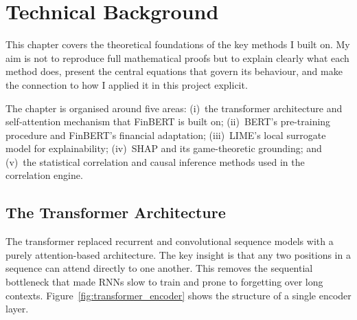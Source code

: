 \chapter{Technical Background}\label{chap:theory}

This chapter covers the theoretical foundations of the key methods I built on.
My aim is not to reproduce full mathematical proofs but to explain clearly what each
method does, present the central equations that govern its behaviour, and make the
connection to how I applied it in this project explicit.

The chapter is organised around five areas:
(i)~the transformer architecture and self-attention mechanism that FinBERT is built on;
(ii)~BERT's pre-training procedure and FinBERT's financial adaptation;
(iii)~LIME's local surrogate model for explainability;
(iv)~SHAP and its game-theoretic grounding; and
(v)~the statistical correlation and causal inference methods used in the correlation engine.

\section{The Transformer Architecture}

The transformer \citep{vaswani2017attention} replaced recurrent and convolutional sequence
models with a purely attention-based architecture.
The key insight is that any two positions in a sequence can attend directly to one
another. This removes the sequential bottleneck that made RNNs slow to train and prone
to forgetting over long contexts.  Figure~\ref{fig:transformer_encoder} shows the structure of a single encoder layer.

